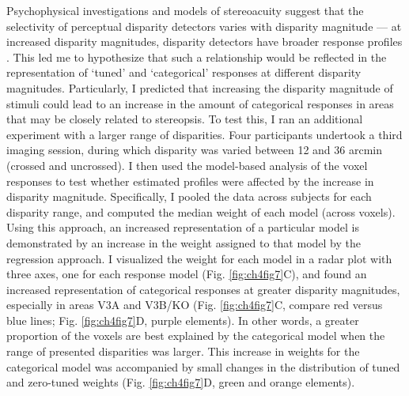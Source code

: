 Psychophysical investigations and models of stereoacuity suggest that the selectivity of perceptual disparity detectors varies with disparity magnitude --- at increased disparity magnitudes, disparity detectors have broader response profiles \cite{Stevenson:1992kx,Lehky:1990fk}. This led me to hypothesize that such a relationship would be reflected in the representation of `tuned' and `categorical' responses at different disparity magnitudes. Particularly, I predicted that increasing the disparity magnitude of stimuli could lead to an increase in the amount of categorical responses in areas that may be closely related to stereopsis. To test this, I ran an additional experiment with a larger range of disparities. Four participants undertook a third imaging session, during which disparity was varied between 12 and 36 arcmin (crossed and uncrossed). I then used the model-based analysis of the voxel responses to test whether estimated profiles were affected by the increase in disparity magnitude. Specifically, I pooled the data across subjects for each disparity range, and computed the median weight of each model (across voxels). Using this approach, an increased representation of a particular model is demonstrated by an increase in the weight assigned to that model by the regression approach. I visualized the weight for each model in a radar plot with three axes, one for each response model (Fig. \ref{fig:ch4fig7}C), and found an increased representation of categorical responses at greater disparity magnitudes, especially in areas V3A and V3B/KO (Fig. \ref{fig:ch4fig7}C, compare red versus blue lines; Fig. \ref{fig:ch4fig7}D, purple elements). In other words, a greater proportion of the voxels are best explained by the categorical model when the range of presented disparities was larger. This increase in weights for the categorical model was accompanied by small changes in the distribution of tuned and zero-tuned weights (Fig. \ref{fig:ch4fig7}D, green and orange elements). 
